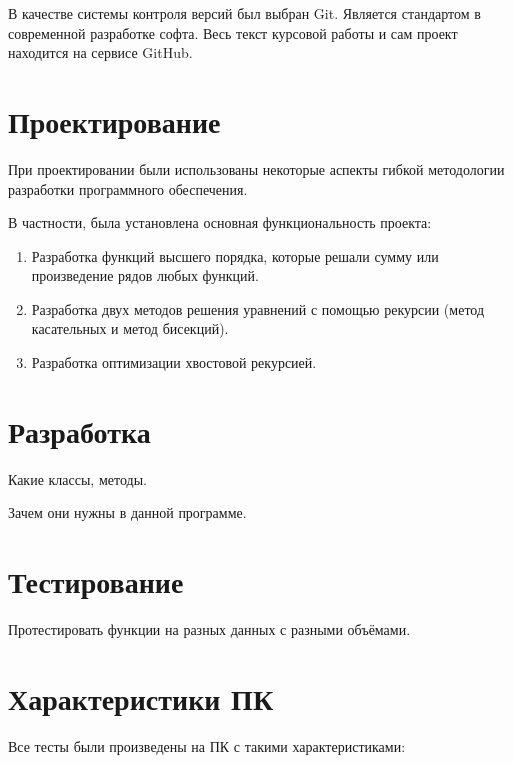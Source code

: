 В качестве системы контроля версий был выбран Git. Является стандартом в современной разработке софта. Весь текст курсовой работы и сам проект находится на сервисе GitHub\cite{GitHub}.

\newpage
\section{Проектирование}

При проектировании были использованы некоторые аспекты гибкой методологии разработки программного обеспечения.

В частности, была установлена основная функциональность проекта:

\begin{enumerate}
	\item Разработка функций высшего порядка, которые решали сумму или произведение рядов любых функций.
	\item Разработка двух методов решения уравнений с помощью рекурсии (метод касательных и метод бисекций).
	\item Разработка оптимизации хвостовой рекурсией.
\end{enumerate}

\newpage
\section{Разработка}

Какие классы, методы.

Зачем они нужны в данной программе.

\newpage
\section{Тестирование}

Протестировать функции на разных данных с разными объёмами.

\newpage
\section{Характеристики ПК}

Все тесты были произведены на ПК с такими характеристиками:


